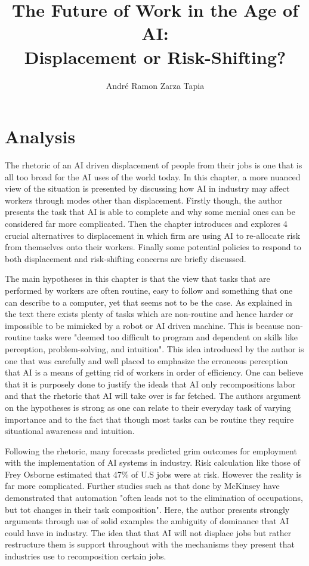 \documentclass[a4paper,11pt,oneside]{report}
\title{The Future of Work in the Age of AI:\\ Displacement or Risk-Shifting?}
\author{André Ramon Zarza Tapia}
\begin{document}
\maketitle



\chapter{Analysis}

The rhetoric of an AI driven displacement of people from their jobs is one that is all too broad for the AI uses of the world today. In this chapter, a more nuanced view of the situation is presented by discussing how AI in industry may affect workers through modes other than displacement. Firstly though, the author presents the task that AI is able to complete and why some menial ones can be considered far more complicated. Then the chapter introduces and explores 4 crucial alternatives to displacement in which firm are using AI to re-allocate risk from themselves onto their workers. Finally some potential policies to respond to both displacement and risk-shifting concerns are briefly discussed.

The main hypotheses in this chapter is that the view that tasks that are performed by workers are often routine, easy to follow and something that one can describe to a computer, yet that seems not to be the case. As explained in the text there exists plenty of tasks which are non-routine and hence harder or impossible to be mimicked by a robot or AI driven machine. This is because non-routine tasks were "deemed too difficult to program and dependent on skills like perception, problem-solving, and intuition". This idea introduced by the author is one that was carefully and well placed to emphasize the erroneous perception that AI is a means of getting rid of workers in order of efficiency. One can believe that it is purposely done to justify the ideals that AI only recompositions labor and that the rhetoric that AI will take over is far fetched. The authors argument on the hypotheses is strong as one can relate to their everyday task of varying importance and to the fact that though most tasks can be routine they require situational awareness and intuition.

Following the rhetoric, many forecasts predicted grim outcomes for employment with the implementation of AI systems in industry. Risk calculation like those of Frey Osborne estimated that 47\% of U.S jobs were at risk. However the reality is far more complicated. Further studies such as that done by McKinsey have demonstrated that automation "often leads not to the elimination of occupations, but tot changes in their task composition". Here, the author presents strongly arguments through use of solid examples the ambiguity of dominance that AI could have in industry. The idea that that AI will not displace jobs but rather restructure them is support throughout with the mechanisms they present that industries use to recomposition certain jobs.
\end{document}

